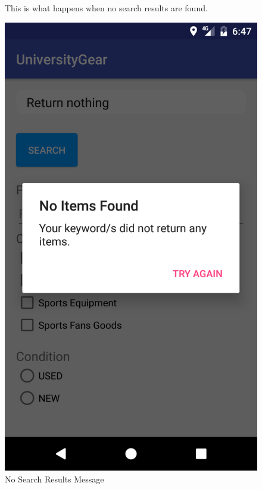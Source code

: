 \documentclass[journal,compsoc, 10pt, draftclsnofoot, onecolumn]{IEEEtran}
\begin{document}
\begin{figure}[!h]
This is what happens when no search results are found. 
\centering
\caption{No Search Results Message}
\includegraphics[scale=.15]{noSearchResults}
\end{figure}
\FloatBarrier
\end{document}
